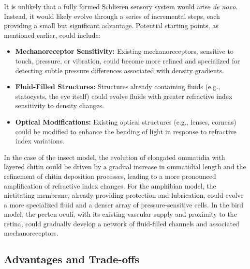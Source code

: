 \documentclass[11pt]{article}
\begin{document}
It is unlikely that a fully formed Schlieren sensory system would arise \textit{de novo}. Instead, it would likely evolve through a series of incremental steps, each providing a small but significant advantage. Potential starting points, as mentioned earlier, could include:
\begin{itemize}
    \item \textbf{Mechanoreceptor Sensitivity:} Existing mechanoreceptors, sensitive to touch, pressure, or vibration, could become more refined and specialized for detecting subtle pressure differences associated with density gradients.
    \item \textbf{Fluid-Filled Structures:} Structures already containing fluids (e.g., statocysts, the eye itself) could evolve fluids with greater refractive index sensitivity to density changes.
    \item \textbf{Optical Modifications:} Existing optical structures (e.g., lenses, corneas) could be modified to enhance the bending of light in response to refractive index variations.
\end{itemize}
In the case of the insect model, the evolution of elongated ommatidia with layered chitin could be driven by a gradual increase in ommatidial length and the refinement of chitin deposition processes, leading to a more pronounced amplification of refractive index changes. For the amphibian model, the nictitating membrane, already providing protection and lubrication, could evolve a more specialized fluid and a denser array of pressure-sensitive cells. In the bird model, the pecten oculi, with its existing vascular supply and proximity to the retina, could gradually develop a network of fluid-filled channels and associated mechanoreceptors.

\subsection{Advantages and Trade-offs}
\end{document}
